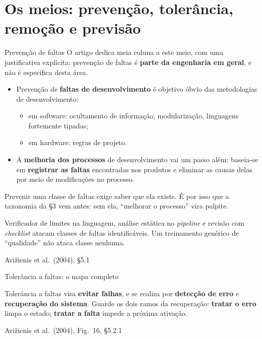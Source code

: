 \documentclass{beamer}
\newcommand{\sect}[1]{\par\smallskip\hfill{\tiny\color{black!55}Avi\v{z}ienis et al.\ (2004), #1}}
\begin{document}
\section{Os meios: preven\c{c}\~ao, toler\^ancia, remo\c{c}\~ao e previs\~ao}

\begin{frame}{Preven\c{c}\~ao de faltas}
    \footnotesize
    O artigo dedica meia coluna a este meio, com uma justificativa explícita: preven\c{c}\~ao de faltas \'e \textbf{parte da engenharia em geral}, e n\~ao \'e espec\'ifica desta \'area.
    \medskip
    \begin{itemize}
        \item Preven\c{c}\~ao de \textbf{faltas de desenvolvimento} \'e objetivo \'obvio das metodologias de desenvolvimento:
        \begin{itemize}
            \item em software: ocultamento de informa\c{c}\~ao, modulariza\c{c}\~ao, linguagens fortemente tipadas;
            \item em hardware: regras de projeto.
        \end{itemize}
        \item A \textbf{melhoria dos processos} de desenvolvimento vai um passo al\'em: baseia-se em \textbf{registrar as faltas} encontradas nos produtos e eliminar as causas delas por meio de modifica\c{c}\~oes no processo.
    \end{itemize}
    \medskip
    \begin{ancora}
        \footnotesize
        Prevenir uma classe de faltas exige saber que ela existe. \'E por isso que a taxonomia da \S3 vem antes: sem ela, ``melhorar o processo'' vira palpite.
    \end{ancora}
    \medskip
    \begin{pratica}
        \scriptsize
        Verificador de limites na linguagem, an\'alise est\'atica no \textit{pipeline} e revis\~ao com \textit{checklist} atacam classes de faltas identific\'aveis. Um treinamento gen\'erico de ``qualidade'' n\~ao ataca classe nenhuma.
    \end{pratica}
    \sect{\S5.1}
\end{frame}

\begin{frame}{Toler\^ancia a faltas: o mapa completo}
    \centering
    \diagTolerancia
    \vspace{0.1em}
    \begin{ancora}
        \scriptsize
        Toler\^ancia a faltas visa \textbf{evitar falhas}, e se realiza por \textbf{detec\c{c}\~ao de erro} e \textbf{recupera\c{c}\~ao do sistema}. Guarde os dois ramos da recupera\c{c}\~ao: \textbf{tratar o erro} limpa o estado; \textbf{tratar a falta} impede a pr\'oxima ativa\c{c}\~ao.
    \end{ancora}
    \sect{Fig.\ 16, \S5.2.1}
\end{frame}
\end{document}

